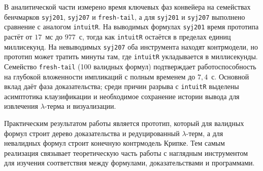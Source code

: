 \documentclass[14pt, russian]{scrartcl}
\begin{document}
В аналитической части измерено время ключевых фаз конвейера на семействах
бенчмарков \texttt{syj201}, \texttt{syj207} и \texttt{fresh-tail}, а для
\texttt{syj201} и \texttt{syj207} выполнено сравнение с аналогом
\texttt{intuitR}. На выводимых формулах \texttt{syj201} время прототипа растёт
от $17$~мс до $977$~с, тогда как \texttt{intuitR} остаётся в пределах единиц
миллисекунд. На невыводимых \texttt{syj207} оба инструмента находят
контрмодели, но прототип может тратить минуты там, где \texttt{intuitR}
укладывается в миллисекунды. Семейство \texttt{fresh-tail} (100 валидных
формул) подтверждает работоспособность на глубокой вложенности импликаций
с полным временем до $7{,}4$~с. Основной вклад даёт фаза доказательства;
среди причин разрыва с \texttt{intuitR} выделены асимптотика клаузификации
и необходимое сохранение истории вывода для извлечения $\lambda$-терма и
визуализации.

Практическим результатом работы является прототип, который для валидных формул
строит дерево доказательства и редуцированный $\lambda$-терм, а для невалидных
формул строит конечную контрмодель Крипке. Тем самым реализация связывает
теоретическую часть работы с наглядным инструментом для изучения соответствия
между формулами, доказательствами и программами.


\printbibliography[heading=none]

\anonappendix
\label{app:ljt}
\end{document}
